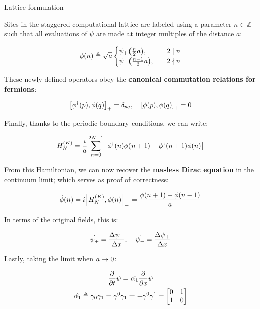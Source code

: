 \documentclass[9pt, handout, aspectratio=169]{beamer}	%
\begin{document}
\begin{frame}[allowframebreaks]{Lattice formulation}
\break

	Sites in the staggered computational lattice are labeled using a parameter $n \in \mathds{Z}$ such that all evaluations of $\psi$ are made at integer multiples of the distance $a$:

	\begin{gather*}
	  \phi(n) \defeq \sqrt{a}
	    \begin{cases}
	      \psi_{+}\qty(\frac{n}{2}a) \qc &2 \mid n \\
	      \psi_{-}\qty(\frac{n-1}{2}a) \qc &2 \nmid n
	    \end{cases}
	\end{gather*}

	These newly defined operators obey the \textbf{canonical commutation relations for fermions}:

	\begin{gather*} \label{eq:fermion-canonical-commutation-relations}
	  \acom{\phi^{\dagger}(p)}{\phi(q)} = \delta_{pq} \qc
	  \acom{\phi(p)}{\phi(q)} = 0
	\end{gather*}

	Finally, thanks to the periodic boundary conditions, we can write:

	\begin{gather*}
	  H_{N}^{(K)} =
	    \frac{i}{a} \sum_{n=0}^{2N-1} \qty[
	    \phi^{\dagger}(n)\phi(n+1) - \phi^{\dagger}(n+1)\phi(n)]
	\end{gather*}

\break

	From this Hamiltonian, we can now recover the \textbf{masless Dirac equation} in the continuum limit; which serves as proof of correctness:

	\begin{gather*}
	  \dot{\phi}(n) = i\com{H_{N}^{(K)}}{\phi(n)} = \frac{\phi(n+1)-\phi(n-1)}{a}
	\end{gather*}

	In terms of the original fields, this is:

	\begin{gather*}
	  \dot{\psi_{+}} = \frac{\Delta \psi_{-}}{\Delta x} \qc
	  \dot{\psi_{-}} = \frac{\Delta \psi_{+}}{\Delta x}
	\end{gather*}

	Lastly, taking the limit when $a \rightarrow 0$:

	\begin{gather*}
	  \pderivative{t}\psi = \hat{\alpha_1}\pderivative{x}\psi \\
	  \hat{\alpha_1} \defeq \gamma_{0}\gamma_{1} = \gamma^{0}\gamma_{1}
	    = -\gamma^{0}\gamma^{1} = \mqty[0 & 1 \\ 1 & 0]
	\end{gather*}


\end{frame}
\end{document}
